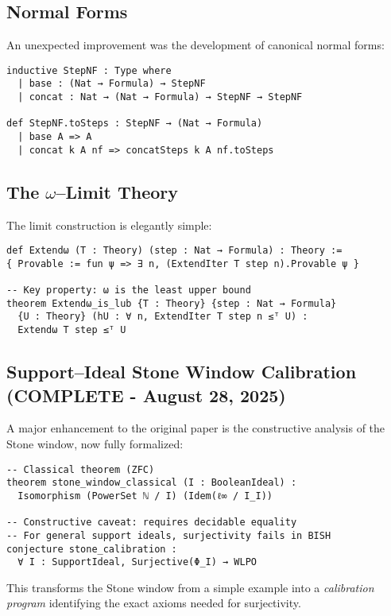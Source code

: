 \documentclass[11pt]{article}
\theoremstyle{definition}
\theoremstyle{remark}
\begin{document}
\subsection{Normal Forms}

An unexpected improvement was the development of canonical normal forms:

\begin{lstlisting}[language={}]
inductive StepNF : Type where
  | base : (Nat → Formula) → StepNF
  | concat : Nat → (Nat → Formula) → StepNF → StepNF

def StepNF.toSteps : StepNF → (Nat → Formula)
  | base A => A
  | concat k A nf => concatSteps k A nf.toSteps
\end{lstlisting}

\subsection{The $\omega$--Limit Theory}

The limit construction is elegantly simple:

\begin{lstlisting}[language={}]
def Extendω (T : Theory) (step : Nat → Formula) : Theory :=
{ Provable := fun ψ => ∃ n, (ExtendIter T step n).Provable ψ }

-- Key property: ω is the least upper bound
theorem Extendω_is_lub {T : Theory} {step : Nat → Formula} 
  {U : Theory} (hU : ∀ n, ExtendIter T step n ≤ᵀ U) :
  Extendω T step ≤ᵀ U
\end{lstlisting}

\subsection{Support--Ideal Stone Window Calibration (COMPLETE - August 28, 2025)}

A major enhancement to the original paper is the constructive analysis of the Stone window, now fully formalized:

\begin{lstlisting}[language={}]
-- Classical theorem (ZFC)
theorem stone_window_classical (I : BooleanIdeal) :
  Isomorphism (PowerSet ℕ / I) (Idem(ℓ∞ / I_I))

-- Constructive caveat: requires decidable equality
-- For general support ideals, surjectivity fails in BISH
conjecture stone_calibration :
  ∀ I : SupportIdeal, Surjective(Φ_I) → WLPO
\end{lstlisting}

This transforms the Stone window from a simple example into a \emph{calibration program} identifying the exact axioms needed for surjectivity.
\end{document}
